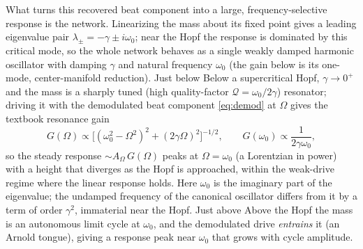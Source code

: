 \documentclass[11pt,a4paper]{article}
\providecommand{\DIFaddtex}[1]{{\protect\color{blue} \sf #1}} %
\providecommand{\DIFdeltex}[1]{{\protect\color{red} \scriptsize #1}} %
\providecommand{\DIFaddbegin}{} %
\providecommand{\DIFaddend}{} %
\providecommand{\DIFdelbegin}{} %
\providecommand{\DIFdelend}{} %
\providecommand{\DIFadd}[1]{\texorpdfstring{\DIFaddtex{#1}}{#1}} %
\providecommand{\DIFdel}[1]{\texorpdfstring{\DIFdeltex{#1}}{}} %
\begin{document}
What turns this recovered beat component into a large, frequency-selective response is
the network. Linearizing the mass about its fixed point gives a leading eigenvalue pair
$\lambda_\pm=-\gamma\pm i\omega_0$; near the Hopf the response is dominated by this critical
mode, so the whole network behaves as a single weakly damped harmonic oscillator with
damping $\gamma$ and natural frequency $\omega_0$ (the gain below is its one-mode,
center-manifold reduction). \DIFdelbegin \DIFdel{Just below }\DIFdelend \DIFaddbegin \DIFadd{Below }\DIFaddend a supercritical Hopf, $\gamma\to0^+$ and
the mass is a sharply tuned (high quality-factor $\mathcal{Q}=\omega_0/2\gamma$) resonator;
driving it with the demodulated beat component
\eqref{eq:demod} at $\Omega$ gives the textbook resonance gain
\begin{equation}
G(\Omega)\propto\big[(\omega_0^2-\Omega^2)^2+(2\gamma\Omega)^2\big]^{-1/2},
\qquad G(\omega_0)\propto\frac{1}{2\gamma\omega_0},
\label{eq:gain}
\end{equation}
so the steady response $\sim A_\Omega\,G(\Omega)$ peaks at $\Omega=\omega_0$ (a
Lorentzian in power) with a height that diverges as the Hopf is approached, within the
weak-drive regime where the linear response holds. Here $\omega_0$ is the imaginary part of
the eigenvalue; the undamped frequency of the canonical oscillator differs from it by a
term of order $\gamma^2$, immaterial near the Hopf. \DIFdelbegin \DIFdel{Just above }\DIFdelend \DIFaddbegin \DIFadd{Above }\DIFaddend the
Hopf the mass is an autonomous limit cycle at $\omega_0$, and the demodulated drive
\emph{entrains} it (an Arnold tongue), giving a response peak near $\omega_0$ that
grows with cycle amplitude.
\end{document}
